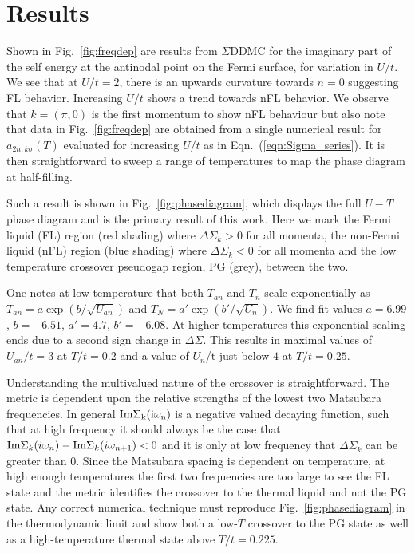 \documentclass[twocolumn,notitlepage,prl,superscriptaddress,showpacs]{revtex4-1}
\begin{document}
\section{Results}

 Shown in Fig.~\ref{fig:freqdep} are results from $\Sigma$DDMC for the imaginary part of the self energy at the antinodal point on the Fermi surface, for variation in $U/t$. We see that at $U/t=2$, there is an upwards curvature towards $n=0$ suggesting FL behavior. Increasing $U/t$ shows a trend towards nFL behavior.
We observe that $k=(\pi,0)$ is the first momentum to show nFL behaviour but also note that data in Fig.~\ref{fig:freqdep} are obtained from a single numerical result for $a_{2n,k\sigma}(T)$ evaluated for increasing $U/t$ as in Eqn.~(\ref{eqn:Sigma_series}).  It is then straightforward to sweep a range of temperatures to map the phase diagram at half-filling.

 Such a result is shown in Fig.~\ref{fig:phasediagram}, which displays the full $U-T$ phase diagram and is the primary result of this work.  Here we mark the Fermi liquid (FL) region (red shading) where $\Delta \Sigma_{k} >0$ for all momenta, the non-Fermi liquid (nFL) region (blue shading) where $\Delta \Sigma_{k} <0$ for all momenta and the low temperature crossover pseudogap region, PG (grey), between the two.

 One notes at low temperature that both $T_{an}$ and $T_n$ scale exponentially as $T_{an}=a\exp(b/\sqrt{U_{an}})$ and $T_N=a'\exp(b'/\sqrt{U_n})$.  We find fit values $a=6.99$, $b=-6.51$, $a'=4.7$, $b'=-6.08$.  At higher temperatures this exponential scaling ends due to a second sign change in $\Delta \Sigma$. This results in maximal values of $U_{an}/t=3$ at $T/t=0.2$ and a value of $U_n$/t just below $4$ at $T/t=0.25$.

 Understanding the multivalued nature of the crossover is straightforward.  The metric is dependent upon the relative strengths of the lowest two Matsubara frequencies.  In general $\rm{Im}\Sigma_{k}(i\omega_n)$ is a negative valued decaying function, such that at high frequency it should always be the case that ${\rm Im}\Sigma_{k}(i\omega_n)-{\rm Im}\Sigma_{k}(i\omega_{n+1})<0$ and it is only at low frequency that $\Delta \Sigma_{k}$ can be greater than 0.  Since the Matsubara spacing is dependent on temperature, at high enough temperatures the first two frequencies are too large to see the FL state and the metric identifies the crossover to the thermal liquid and not the PG state.  Any correct numerical technique must reproduce Fig.~\ref{fig:phasediagram} in the thermodynamic limit and show both a low-$T$ crossover to the PG state as well as a high-temperature thermal state above $T/t=0.225$.
\end{document}
